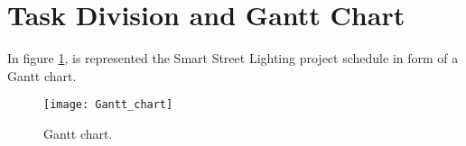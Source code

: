 \section{Task Division and Gantt Chart}
In figure \ref{fig:Gantt_chart}, is represented the Smart Street Lighting project schedule in form of a Gantt chart.

\begin{figure}[ht]
	\centering
	\texttt{[image: Gantt\_chart]}
	\caption{Gantt chart.}
	\label{fig:Gantt_chart}
\end{figure}
